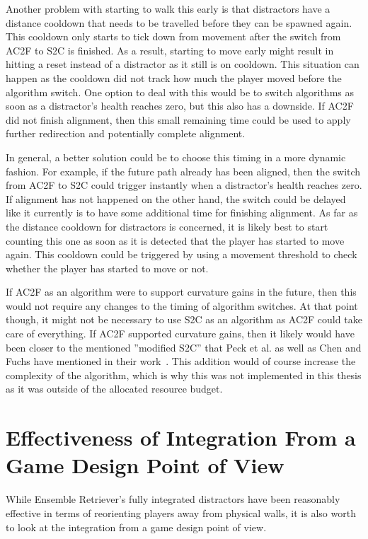 Another problem with starting to walk this early is that distractors have a distance cooldown that needs to be travelled before they can be spawned again. This cooldown only starts to tick down from movement after the switch from AC2F to S2C is finished. As a result, starting to move early might result in hitting a reset instead of a distractor as it still is on cooldown. This situation can happen as the cooldown did not track how much the player moved before the algorithm switch. One option to deal with this would be to switch algorithms as soon as a distractor's health reaches zero, but this also has a downside. If AC2F did not finish alignment, then this small remaining time could be used to apply further redirection and potentially complete alignment. 

In general, a better solution could be to choose this timing in a more dynamic fashion. For example, if the future path already has been aligned, then the switch from AC2F to S2C could trigger instantly when a distractor's health reaches zero. If alignment has not happened on the other hand, the switch could be delayed like it currently is to have some additional time for finishing alignment. As far as the distance cooldown for distractors is concerned, it is likely best to start counting this one as soon as it is detected that the player has started to move again. This cooldown could be triggered by using a movement threshold to check whether the player has started to move or not.  

If AC2F as an algorithm were to support curvature gains in the future, then this would not require any changes to the timing of algorithm switches. At that point though, it might not be necessary to use S2C as an algorithm as AC2F could take care of everything. If AC2F supported curvature gains, then it likely would have been closer to the mentioned ''modified S2C'' that Peck et al. as well as Chen and Fuchs have mentioned in their work~\cite{peck2010improved, chen2017towards, chen2017supporting}. This addition would of course increase the complexity of the algorithm, which is why this was not implemented in this thesis as it was outside of the allocated resource budget.

\section{Effectiveness of Integration From a Game Design Point of View}
While Ensemble Retriever's fully integrated distractors have been reasonably effective in terms of reorienting players away from physical walls, it is also worth to look at the integration from a game design point of view. 

